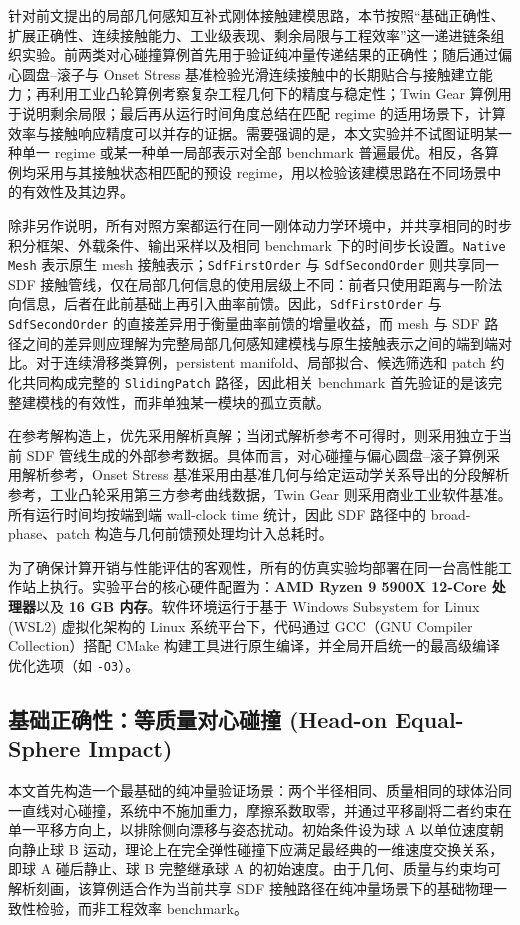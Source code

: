 针对前文提出的局部几何感知互补式刚体接触建模思路，本节按照“基础正确性、扩展正确性、连续接触能力、工业级表现、剩余局限与工程效率”这一递进链条组织实验。前两类对心碰撞算例首先用于验证纯冲量传递结果的正确性；随后通过偏心圆盘--滚子与 Onset Stress 基准检验光滑连续接触中的长期贴合与接触建立能力；再利用工业凸轮算例考察复杂工程几何下的精度与稳定性；Twin Gear 算例用于说明剩余局限；最后再从运行时间角度总结在匹配 regime 的适用场景下，计算效率与接触响应精度可以并存的证据。需要强调的是，本文实验并不试图证明某一种单一 regime 或某一种单一局部表示对全部 benchmark 普遍最优。相反，各算例均采用与其接触状态相匹配的预设 regime，用以检验该建模思路在不同场景中的有效性及其边界。

除非另作说明，所有对照方案都运行在同一刚体动力学环境中，并共享相同的时步积分框架、外载条件、输出采样以及相同 benchmark 下的时间步长设置。\texttt{Native Mesh} 表示原生 mesh 接触表示；\texttt{SdfFirstOrder} 与 \texttt{SdfSecondOrder} 则共享同一 SDF 接触管线，仅在局部几何信息的使用层级上不同：前者只使用距离与一阶法向信息，后者在此前基础上再引入曲率前馈。因此，\texttt{SdfFirstOrder} 与 \texttt{SdfSecondOrder} 的直接差异用于衡量曲率前馈的增量收益，而 mesh 与 SDF 路径之间的差异则应理解为完整局部几何感知建模栈与原生接触表示之间的端到端对比。对于连续滑移类算例，persistent manifold、局部拟合、候选筛选和 patch 约化共同构成完整的 \texttt{SlidingPatch} 路径，因此相关 benchmark 首先验证的是该完整建模栈的有效性，而非单独某一模块的孤立贡献。

在参考解构造上，优先采用解析真解；当闭式解析参考不可得时，则采用独立于当前 SDF 管线生成的外部参考数据。具体而言，对心碰撞与偏心圆盘--滚子算例采用解析参考，Onset Stress 基准采用由基准几何与给定运动学关系导出的分段解析参考，工业凸轮采用第三方参考曲线数据，Twin Gear 则采用商业工业软件基准。所有运行时间均按端到端 wall-clock time 统计，因此 SDF 路径中的 broad-phase、patch 构造与几何前馈预处理均计入总耗时。

为了确保计算开销与性能评估的客观性，所有的仿真实验均部署在同一台高性能工作站上执行。实验平台的核心硬件配置为：\textbf{AMD Ryzen 9 5900X 12-Core 处理器}以及 \textbf{16 GB 内存}。软件环境运行于基于 Windows Subsystem for Linux (WSL2) 虚拟化架构的 Linux 系统平台下，代码通过 GCC（GNU Compiler Collection）搭配 CMake 构建工具进行原生编译，并全局开启统一的最高级编译优化选项（如 \texttt{-O3}）。

\subsection{基础正确性：等质量对心碰撞 (Head-on Equal-Sphere Impact)}
本文首先构造一个最基础的纯冲量验证场景：两个半径相同、质量相同的球体沿同一直线对心碰撞，系统中不施加重力，摩擦系数取零，并通过平移副将二者约束在单一平移方向上，以排除侧向漂移与姿态扰动。初始条件设为球 A 以单位速度朝向静止球 B 运动，理论上在完全弹性碰撞下应满足最经典的一维速度交换关系，即球 A 碰后静止、球 B 完整继承球 A 的初始速度。由于几何、质量与约束均可解析刻画，该算例适合作为当前共享 SDF 接触路径在纯冲量场景下的基础物理一致性检验，而非工程效率 benchmark。

